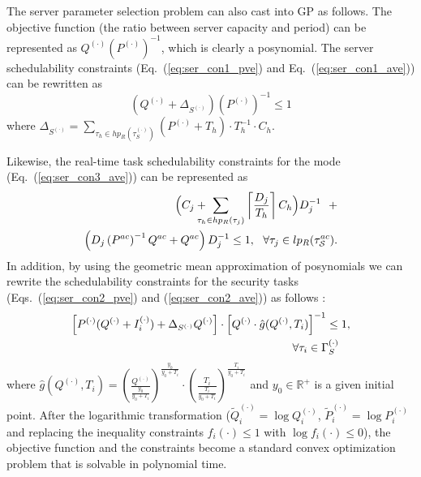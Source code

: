 The server parameter selection problem can also cast into GP as follows. The objective function (\eg the ratio between server capacity and period) can be represented as $Q^{(\cdot)} \left(P^{(\cdot)}\right)^{-1}$, which is clearly a posynomial. The server schedulability constraints (\eg Eq.~(\ref{eq:ser_con1_pve}) and Eq.~(\ref{eq:ser_con1_ave})) can be rewritten as \begin{equation} \label{eq:posy_server1}
\left(Q^{(\cdot)} + \Delta_{S^{(\cdot)}} \right) \left(P^{(\cdot)} \right)^{-1} \leq 1 
\end{equation}
where $\Delta_{S^{(\cdot)}} =
  \sum\limits_{\tau_h \in hp_R(\tau_S^{(\cdot)})} (P^{(\cdot)} + T_h) \cdot T_h^{-1} \cdot C_h $. 
  
  Likewise, the real-time task schedulability constraints for the \ave mode (\eg Eq.~(\ref{eq:ser_con3_ave})) can be represented as
  \begin{equation}
  \begin{aligned}
\Big(  C_j + \hspace*{-1em} \sum_{\tau_h \in hp_R(\tau_j)} \left\lceil \frac{D_j}{T_h} \right\rceil C_h \Big)D_j^{-1} ~~+ \\ 
\left( D_j \left(P^{ac}\right)^{-1} Q^{ac} + Q^{ac} \right) D_j^{-1} \leq 1, ~~\forall \tau_j \in lp_R(\tau_\mathcal{S}^{ac}).
  \end{aligned}
  \end{equation}
 In addition, by using the geometric mean approximation \cite[Ch. 2]{gp_comm} of posynomials we can rewrite the schedulability constraints for the security tasks (\eg Eqs.~(\ref{eq:ser_con2_pve}) and (\ref{eq:ser_con2_ave})) as follows \cite{mhasan_rtss16}:
 \begin{equation}
 \begin{aligned}
\left[P^{(\cdot)}  (Q^{(\cdot)} + I_i^{(\cdot)}) + \Delta_{S^{(\cdot)}}  Q^{(\cdot)} \right] \cdot {\left[Q^{(\cdot)} \cdot  \hat{g}(Q^{(\cdot)}, T_i) \right]}^{-1} \leq 1, \\ 
\forall \tau_i \in \Gamma_S^{(\cdot)} \hspace*{1em}
 \end{aligned}
\end{equation} 
where $\hat{g}(Q^{(\cdot)}, T_i) = {\left( \frac{Q^{(\cdot)}}{\frac{y_0}{y_0 + T_i}} \right)}^{\frac{y_0}{y_0 + T_i}} \cdot {\left( \frac{T_i}{\frac{T_i}{y_0 + T_i}} \right)}^{\frac{T_i}{y_0 + T_i}}$ and $y_0 \in \mathbb{R}^+$ is a given initial point.
  After the logarithmic transformation (\eg $\tilde{Q}_i^{(\cdot)} = \log Q_i^{(\cdot)}$, $\tilde{P}_i^{(\cdot)} = \log P_i^{(\cdot)}$ and replacing the inequality constraints $f_i(\cdot) \leq 1$ with $\log f_i(\cdot) \leq 0$), the objective function and the constraints become a standard convex optimization problem that is solvable in polynomial time.
  

  
% 